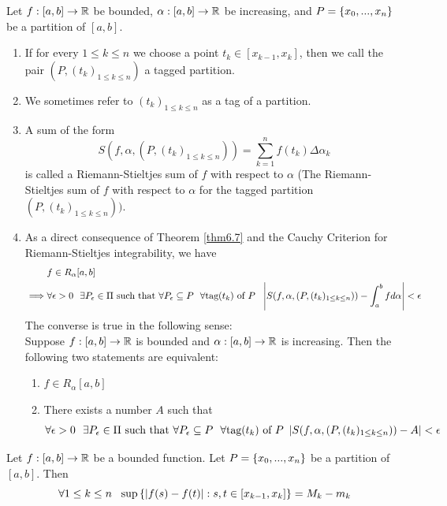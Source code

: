 \begin{remark}
    Let $f: [a,b] \to \mathbb{R}$ be bounded, $\alpha : [a,b] \to \mathbb{R}$ be increasing, and $P = \left\{x_0, ..., x_n\right\}$ be a partition of $[a,b]$.
    \begin{enumerate}[$*$]
        \item If for every $ 1 \leq k \leq n$ we choose a point $t_k \in [x_{k-1}, x_k]$, then we call the pair $\left(P, (t_k)_{1 \leq k \leq n}\right)$ a tagged partition.
        \item We sometimes refer to $\left(t_k\right)_{1 \leq k \leq n}$ as a tag of a partition.
        \item A sum of the form 
        $$S\left(f, \alpha, \left(P, (t_k)_{1 \leq k \leq n}\right)\right) = \sum_{k=1}^{n}f(t_k) \Delta \alpha_k$$
        is called a Riemann-Stieltjes sum of $f$ with respect to $\alpha$ (The Riemann-Stieltjes sum of $f$ with respect to $\alpha$ for the tagged partition $\left(P, (t_k)_{1 \leq k \leq n}\right))$.
        \item As a direct consequence of Theorem \ref{thm6.7} and the Cauchy Criterion for Riemann-Stieltjes integrability, we have
        \begin{align*}
            &f\in R_{\alpha}[a,b] \\ \implies &\forall \epsilon > 0 ~~\exists P_\epsilon \in \Pi \text{ such that } \forall P_\epsilon \subseteq P ~~\forall \text{tag$(t_k)$ of } P ~~\left|S(f, \alpha, \left(P, (t_k)_{1 \leq k \leq n}\right))-\int_{a}^{b}f d\alpha\right| < \epsilon
        \end{align*}
        The converse is true in the following sense: \\
        Suppose $f: [a,b] \to \mathbb{R}$ is bounded and $\alpha : [a,b] \to \mathbb{R}$ is increasing. Then the following two statements are equivalent:
        \begin{enumerate}[($i$)]
            \item $f \in R_\alpha[a,b]$ 
            \item There exists a number $A$ such that 
            $$\forall \epsilon > 0 ~~\exists P_\epsilon \in \Pi \text{ such that } \forall P_\epsilon \subseteq P ~~\forall \text{tag($t_k$) of $P$ } \left|S(f, \alpha, \left(P, (t_k)_{1 \leq k \leq n}\right)) - A\right| < \epsilon$$
        \end{enumerate}
    \end{enumerate}
\end{remark}

\begin{lemma}
    \label{lemma6.1}
    Let $f: [a,b] \to \mathbb{R}$ be a bounded function. Let $P = \left\{x_0, ..., x_n\right\}$ be a partition of $[a,b]$. Then 
    $$\forall 1 \leq k \leq n ~~\sup\left\{\left|f(s) - f(t)\right| : s,t \in [x_{k-1}, x_k]\right\} = M_k - m_k$$
\end{lemma}

